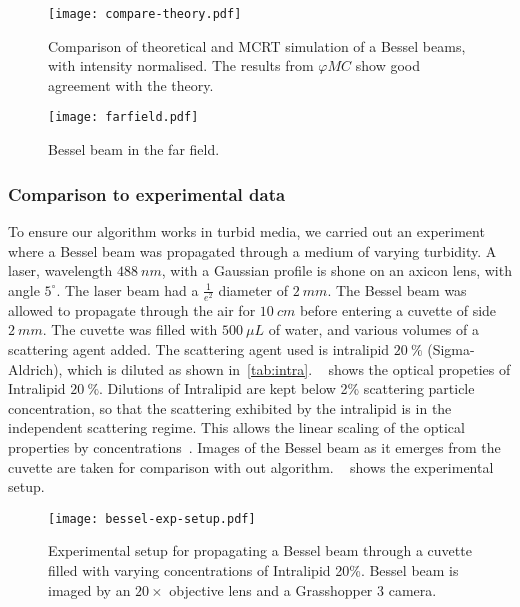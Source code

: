 \begin{figure}[!ht]
    \centering
    \texttt{[image: compare-theory.pdf]}
    \caption{Comparison of theoretical and MCRT simulation of a Bessel beams, with intensity normalised. The results from $\varphi MC$ show good agreement with the theory.}
    \label{fig:besselCompare}
\end{figure}

\begin{figure}
\centering
\texttt{[image: farfield.pdf]}
\caption{Bessel beam in the far field.}
\label{fig:farfield}
\end{figure}

\FloatBarrier

\subsubsection*{Comparison to experimental data}

To ensure our algorithm works in turbid media, we carried out an experiment where a Bessel beam was propagated through a medium of varying turbidity.
A laser, wavelength $488~nm$, with a Gaussian profile is shone on an axicon lens, with angle $5^{\circ}$.
The laser beam had a $\tfrac{1}{e^2}$ diameter of $2~mm$. 
The Bessel beam was allowed to propagate through the air for $10~cm$ before entering a cuvette of side $2~mm$.
The cuvette was filled with $500~\mu L$ of water, and various volumes of a scattering agent added.
The scattering agent used is intralipid $20~\%$ (Sigma-Aldrich), which is diluted as shown in~\cref{tab:intra}.
~ shows the optical propeties of Intralipid $20~\%$.
Dilutions of Intralipid are kept below 2\% scattering particle concentration, so that the scattering exhibited by the intralipid is in the independent scattering regime.
This allows the linear scaling of the optical properties by concentrations~\cite{aernouts2013supercontinuum,vardaki2015studying,di2011effect}.
Images of the Bessel beam as it emerges from the cuvette are taken for comparison with out algorithm.
~ shows the experimental setup.

\begin{figure}[ht!]
    \centering
    \texttt{[image: bessel-exp-setup.pdf]}
    \caption{Experimental setup for propagating a Bessel beam through a cuvette filled with varying concentrations of Intralipid 20\%. Bessel beam is imaged by an $20\times$ objective lens and a Grasshopper 3 camera.}
    \label{fig:expsetup}
\end{figure}


